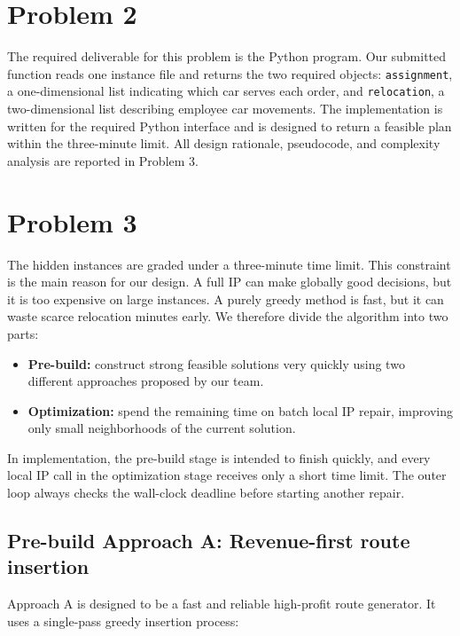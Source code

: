 \documentclass[10pt,a4paper]{article}
\begin{document}
\newpage

\section*{Problem 2}

The required deliverable for this problem is the Python program.  Our submitted
function reads one instance file and returns the two required objects:
\texttt{assignment}, a one-dimensional list indicating which car serves each
order, and \texttt{relocation}, a two-dimensional list describing employee car
movements.  The implementation is written for the required Python interface and
is designed to return a feasible plan within the three-minute limit.  All design
rationale, pseudocode, and complexity analysis are reported in Problem 3.

\section*{Problem 3}

The hidden instances are graded under a three-minute time limit.  This constraint
is the main reason for our design.  A full IP can make globally good decisions,
but it is too expensive on large instances.  A purely greedy method is fast, but
it can waste scarce relocation minutes early.  We therefore divide the algorithm
into two parts:

\begin{itemize}
    \item \textbf{Pre-build:} construct strong feasible solutions very quickly
    using two different approaches proposed by our team.
    \item \textbf{Optimization:} spend the remaining time on batch local IP
    repair, improving only small neighborhoods of the current solution.
\end{itemize}
In implementation, the pre-build stage is intended to finish quickly, and every
local IP call in the optimization stage receives only a short time limit.  The
outer loop always checks the wall-clock deadline before starting another repair.

\subsection*{Pre-build Approach A: Revenue-first route insertion}

Approach A is designed to be a fast and reliable high-profit route generator. It
uses a single-pass greedy insertion process:
\end{document}
